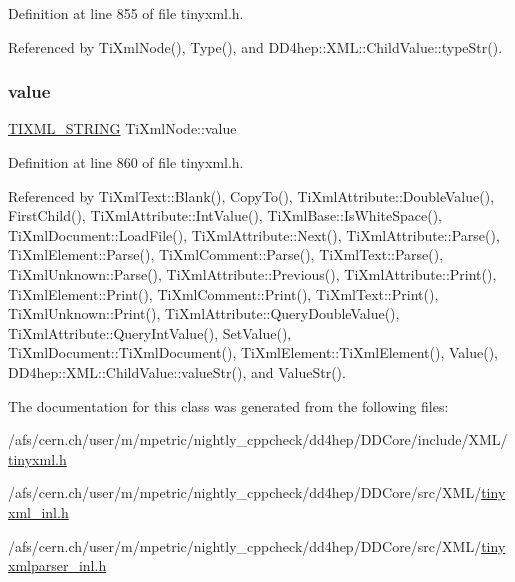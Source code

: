 Definition at line 855 of file tinyxml.\+h.



Referenced by Ti\+Xml\+Node(), Type(), and D\+D4hep\+::\+X\+M\+L\+::\+Child\+Value\+::type\+Str().

\hypertarget{class_ti_xml_node_aead528b3cedc33c16a6c539872c7cc8b}{}\label{class_ti_xml_node_aead528b3cedc33c16a6c539872c7cc8b} 
\subsubsection{\texorpdfstring{value}{value}}
{\footnotesize\ttfamily \hyperlink{tinyxml_8h_a92bada05fd84d9a0c9a5bbe53de26887}{T\+I\+X\+M\+L\+\_\+\+S\+T\+R\+I\+NG} Ti\+Xml\+Node\+::value\hspace{0.3cm}{\ttfamily [protected]}}



Definition at line 860 of file tinyxml.\+h.



Referenced by Ti\+Xml\+Text\+::\+Blank(), Copy\+To(), Ti\+Xml\+Attribute\+::\+Double\+Value(), First\+Child(), Ti\+Xml\+Attribute\+::\+Int\+Value(), Ti\+Xml\+Base\+::\+Is\+White\+Space(), Ti\+Xml\+Document\+::\+Load\+File(), Ti\+Xml\+Attribute\+::\+Next(), Ti\+Xml\+Attribute\+::\+Parse(), Ti\+Xml\+Element\+::\+Parse(), Ti\+Xml\+Comment\+::\+Parse(), Ti\+Xml\+Text\+::\+Parse(), Ti\+Xml\+Unknown\+::\+Parse(), Ti\+Xml\+Attribute\+::\+Previous(), Ti\+Xml\+Attribute\+::\+Print(), Ti\+Xml\+Element\+::\+Print(), Ti\+Xml\+Comment\+::\+Print(), Ti\+Xml\+Text\+::\+Print(), Ti\+Xml\+Unknown\+::\+Print(), Ti\+Xml\+Attribute\+::\+Query\+Double\+Value(), Ti\+Xml\+Attribute\+::\+Query\+Int\+Value(), Set\+Value(), Ti\+Xml\+Document\+::\+Ti\+Xml\+Document(), Ti\+Xml\+Element\+::\+Ti\+Xml\+Element(), Value(), D\+D4hep\+::\+X\+M\+L\+::\+Child\+Value\+::value\+Str(), and Value\+Str().



The documentation for this class was generated from the following files\+:\begin{DoxyCompactItemize}
\item 
/afs/cern.\+ch/user/m/mpetric/nightly\+\_\+cppcheck/dd4hep/\+D\+D\+Core/include/\+X\+M\+L/\hyperlink{tinyxml_8h}{tinyxml.\+h}\item 
/afs/cern.\+ch/user/m/mpetric/nightly\+\_\+cppcheck/dd4hep/\+D\+D\+Core/src/\+X\+M\+L/\hyperlink{tinyxml__inl_8h}{tinyxml\+\_\+inl.\+h}\item 
/afs/cern.\+ch/user/m/mpetric/nightly\+\_\+cppcheck/dd4hep/\+D\+D\+Core/src/\+X\+M\+L/\hyperlink{tinyxmlparser__inl_8h}{tinyxmlparser\+\_\+inl.\+h}\end{DoxyCompactItemize}
